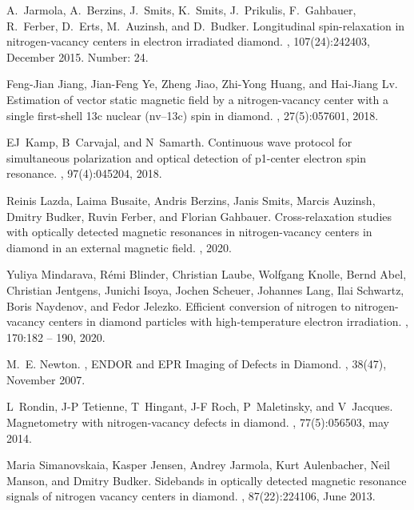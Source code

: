 \documentclass[9pt,twocolumn,twoside]{revtex4-1}
\begin{document}
\begin{thebibliography}{10}
A.~Jarmola, A.~Berzins, J.~Smits, K.~Smits, J.~Prikulis, F.~Gahbauer,
  R.~Ferber, D.~Erts, M.~Auzinsh, and D.~Budker.
\newblock Longitudinal spin-relaxation in nitrogen-vacancy centers in electron
  irradiated diamond.
, 107(24):242403, December 2015.
\newblock Number: 24.

Feng-Jian Jiang, Jian-Feng Ye, Zheng Jiao, Zhi-Yong Huang, and Hai-Jiang Lv.
\newblock Estimation of vector static magnetic field by a nitrogen-vacancy
  center with a single first-shell 13c nuclear (nv--13c) spin in diamond.
, 27(5):057601, 2018.

EJ~Kamp, B~Carvajal, and N~Samarth.
\newblock Continuous wave protocol for simultaneous polarization and optical
  detection of p1-center electron spin resonance.
, 97(4):045204, 2018.

Reinis Lazda, Laima Busaite, Andris Berzins, Janis Smits, Marcis Auzinsh,
  Dmitry Budker, Ruvin Ferber, and Florian Gahbauer.
\newblock Cross-relaxation studies with optically detected magnetic resonances
  in nitrogen-vacancy centers in diamond in an external magnetic field.
, 2020.

Yuliya Mindarava, Rémi Blinder, Christian Laube, Wolfgang Knolle, Bernd Abel,
  Christian Jentgens, Junichi Isoya, Jochen Scheuer, Johannes Lang, Ilai
  Schwartz, Boris Naydenov, and Fedor Jelezko.
\newblock Efficient conversion of nitrogen to nitrogen-vacancy centers in
  diamond particles with high-temperature electron irradiation.
, 170:182 -- 190, 2020.

M.~E. Newton.
, {ENDOR} and {EPR} {Imaging} of {Defects} in {Diamond}.
, 38(47), November 2007.

L~Rondin, J-P Tetienne, T~Hingant, J-F Roch, P~Maletinsky, and V~Jacques.
\newblock Magnetometry with nitrogen-vacancy defects in diamond.
, 77(5):056503, may 2014.

Maria Simanovskaia, Kasper Jensen, Andrey Jarmola, Kurt Aulenbacher, Neil
  Manson, and Dmitry Budker.
\newblock Sidebands in optically detected magnetic resonance signals of
  nitrogen vacancy centers in diamond.
, 87(22):224106, June 2013.


\end{thebibliography}
\end{document}
